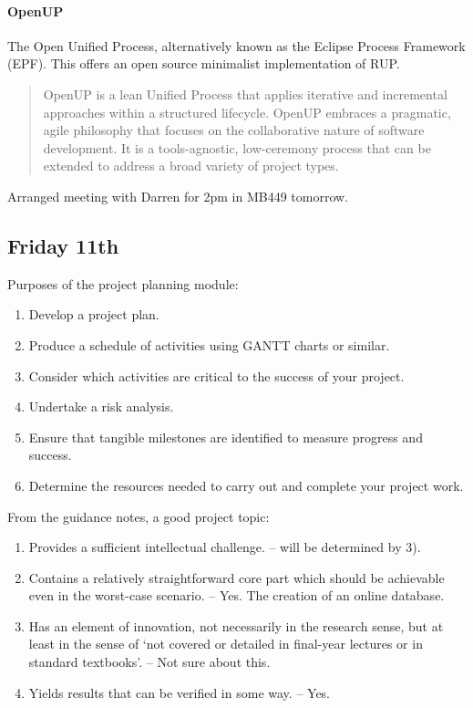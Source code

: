 \paragraph{OpenUP} The Open Unified Process, alternatively known as the Eclipse
Process Framework (EPF). This offers an open source minimalist implementation of
RUP.

\begin{quote}
  OpenUP is a lean Unified Process that applies iterative and incremental
  approaches within a structured lifecycle. OpenUP embraces a pragmatic, agile
  philosophy that focuses on the collaborative nature of software
  development. It is a tools-agnostic, low-ceremony process that can be extended
  to address a broad variety of project types.
\end{quote}

\noindent
Arranged meeting with Darren for 2pm in MB449 tomorrow.

\subsection{Friday 11th}
Purposes of the project planning module:

\begin{enumerate}
\item Develop a project plan.
\item Produce a schedule of activities using GANTT charts or similar.
\item Consider which activities are critical to the success of your project.
\item Undertake a risk analysis.
\item Ensure that tangible milestones are identified to measure progress and
  success.
\item Determine the resources needed to carry out and complete your project
  work.
\end{enumerate}

\noindent
From the guidance notes, a good project topic:

\begin{enumerate}
\item Provides a sufficient intellectual challenge. – will be determined by 3).
\item Contains a relatively straightforward core part which should be achievable
  even in the worst-case scenario. – Yes. The creation of an online database.
\item Has an element of innovation, not necessarily in the research sense, but
  at least in the sense of ‘not covered or detailed in final-year lectures or in
  standard textbooks’. – Not sure about this.
\item Yields results that can be verified in some way. – Yes.
\end{enumerate}

